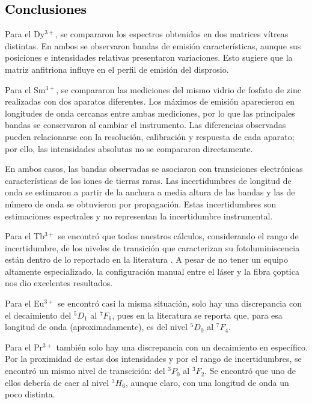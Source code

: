 \textcolor{black}{\section{Conclusiones}}

\noindent Para el Dy$^{3+}$, se compararon los espectros obtenidos en dos matrices
vítreas distintas. En ambos se observaron bandas de emisión
características, aunque sus posiciones e intensidades relativas
presentaron variaciones. Esto sugiere que la matriz anfitriona influye
en el perfil de emisión del disprosio.

Para el Sm$^{3+}$, se compararon las mediciones del mismo vidrio de
fosfato de zinc realizadas con dos aparatos diferentes. Los máximos de
emisión aparecieron en longitudes de onda cercanas entre ambas
mediciones, por lo que las principales bandas se conservaron al cambiar
el instrumento. Las diferencias observadas pueden relacionarse con la
resolución, calibración y respuesta de cada aparato; por ello, las
intensidades absolutas no se compararon directamente.

En ambos casos, las bandas observadas se asociaron con transiciones
electrónicas características de los iones de tierras raras. Las
incertidumbres de longitud de onda se estimaron a partir de la anchura a
media altura de las bandas y las de número de onda se obtuvieron por
propagación. Estas incertidumbres son estimaciones espectrales y no
representan la incertidumbre instrumental.

Para el Tb$^{3+}$ se encontró que todos nuestros cálculos, considerando el rango de incertidumbre, de los niveles de transición que caracterizan su fotoluminiscencia están dentro de lo reportado en la literatura \cite{Tb-literatura}. A pesar de no tener un equipo altamente especializado, la configuración manual entre el láser y la fibra çoptica nos dio excelentes resultados.

Para el Eu$^{3+}$ se encontró casi la misma situación, solo hay una discrepancia con el decaimiento del $^5D_1$ al $^7F_6$, pues en la literatura \cite{Eu_Pr-literatura} se reporta que, para esa longitud de onda (aproximadamente), es del nivel $^5D_0$ al $^7F_4$.

Para el Pr$^{3+}$ también solo hay una discrepancia con un decaimiento en específico. Por la proximidad de estas dos intensidades y por el rango de incertidumbres, se encontró un mismo nivel de transcición: del $^3P_0$ al $^3F_2$. Se encontró \cite{Eu_Pr-literatura} que uno de ellos debería de caer al nivel $^3H_6$, aunque claro, con una longitud de onda un poco distinta.